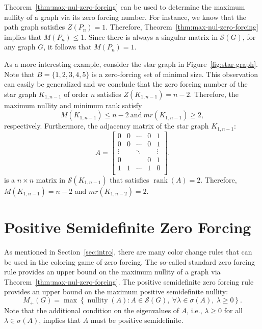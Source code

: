 \documentclass{article}
\theoremstyle{definition}
\newcommand\nullity[1]{\operatorname{nullity}\left(#1\right)}
\newcommand\rank[1]{\operatorname{rank}\left(#1\right)}
\begin{document}
Theorem~\ref{thm:max-nul-zero-forcing} can be used to determine the maximum nullity of a graph via its zero forcing number. 
For instance, we know that the path graph satisfies $Z(P_{n})=1$.
Therefore, Theorem~\ref{thm:max-nul-zero-forcing} implies that $M(P_{n}) \leq 1$.
Since there is always a singular matrix in $\mathcal{S}(G)$, for any graph $G$, it follows that $M(P_{n})=1$.

As a more interesting example, consider the star graph in Figure~\ref{fig:star-graph}.
Note that $B=\{1,2,3,4,5\}$ is a zero-forcing set of minimal size. 
This observation can easily be generalized and we conclude that the zero forcing number of the star graph $K_{1,n-1}$ of order $n$ satisfies $Z(K_{1,n-1}) = n-2$.
Therefore, the maximum nullity and minimum rank satisfy
\[
M(K_{1,n-1}) \leq n-2~\text{and}~mr(K_{1,n-1}) \geq 2,
\]
respectively.
Furthermore, the adjacency matrix of the star graph $K_{1,n-1}$:
\[
A = \begin{bmatrix} 
		0 & 0 & \cdots & 0 & 1 \\
		0 & 0 & \cdots & 0 & 1 \\
		\vdots & & \ddots & &  \vdots \\
		0 & & & 0 & 1 \\
		1 & 1 & \cdots & 1 & 0 \\
	\end{bmatrix}.
\]
is a $n\times n$ matrix in $\mathcal{S}(K_{1,n-1})$ that satisfies $\rank{A} = 2$.
Therefore, $M(K_{1,n-1})=n-2$ and $mr(K_{1,n-2}) = 2$.

\section{Positive Semidefinite Zero Forcing}\label{sec:psd-zf}
As mentioned in Section~\ref{sec:intro}, there are many color change rules that can be used in the coloring game of zero forcing. 
The so-called standard zero forcing rule provides an upper bound on the maximum nullity of a graph via Theorem~\ref{thm:max-nul-zero-forcing}.
The positive semidefinite zero forcing rule provides an upper bound on the maximum positive semidefinite nullity:
\[
M_{+}(G) = \max\left\{\nullity{A}\colon A\in\mathcal{S}(G),~\forall\lambda\in\sigma(A),~\lambda\geq 0\right\}.
\]
Note that the additional condition on the eigenvalues of $A$, i.e., $\lambda\geq 0$ for all $\lambda\in\sigma(A)$, implies that $A$ must be positive semidefinite. 
\end{document}

